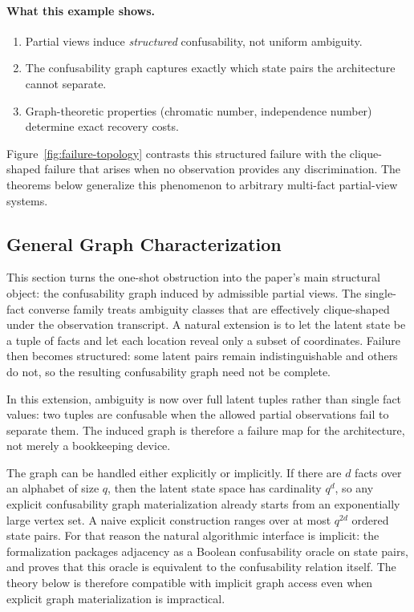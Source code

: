 \paragraph{What this example shows.}
\begin{enumerate}
\item Partial views induce \emph{structured} confusability, not uniform ambiguity.
\item The confusability graph captures exactly which state pairs the architecture cannot separate.
\item Graph-theoretic properties (chromatic number, independence number) determine exact recovery costs.
\end{enumerate}

Figure~\ref{fig:failure-topology} contrasts this structured failure with the clique-shaped failure that arises when no observation provides any discrimination. The theorems below generalize this phenomenon to arbitrary multi-fact partial-view systems.

\subsection{General Graph Characterization}

This section turns the one-shot obstruction into the paper's main structural object: the confusability graph induced by admissible partial views. The single-fact converse family treats ambiguity classes that are effectively clique-shaped under the observation transcript. A natural extension is to let the latent state be a tuple of facts and let each location reveal only a subset of coordinates. Failure then becomes structured: some latent pairs remain indistinguishable and others do not, so the resulting confusability graph need not be complete.

In this extension, ambiguity is now over full latent tuples rather than single fact values: two tuples are confusable when the allowed partial observations fail to separate them. The induced graph is therefore a failure map for the architecture, not merely a bookkeeping device.

The graph can be handled either explicitly or implicitly. If there are $d$ facts over an alphabet of size $q$, then the latent state space has cardinality $q^d$, so any explicit confusability graph materialization already starts from an exponentially large vertex set. A naive explicit construction ranges over at most $q^{2d}$ ordered state pairs. For that reason the natural algorithmic interface is implicit: the formalization packages adjacency as a Boolean confusability oracle on state pairs, and proves that this oracle is equivalent to the confusability relation itself. The theory below is therefore compatible with implicit graph access even when explicit graph materialization is impractical.

